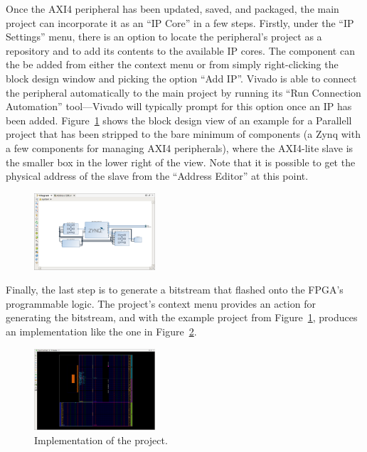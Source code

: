\documentclass[licentiate,g5paper,gu]{chalmers-thesis}
\begin{document}
\begin{appendices}
Once the AXI4 peripheral has been updated, saved, and packaged, the main project can incorporate it as an ``IP Core'' in a few steps. Firstly, under the ``IP Settings'' menu, there is an option to locate the peripheral's project as a repository and to add its contents to the available IP cores. The component can the be added from either the context menu or from simply right-clicking the block design window and picking the option ``Add IP''. Vivado is able to connect the peripheral automatically to the main project by running its ``Run Connection Automation'' tool---Vivado will typically prompt for this option once an IP has been added. Figure~\ref{fig:system} shows the block design view of an example for a Parallell project that has been stripped to the bare minimum of components (a Zynq with a few components for managing AXI4 peripherals), where the AXI4-lite slave is the smaller box in the lower right of the view. Note that it is possible to get the physical address of the slave from the ``Address Editor'' at this point.

\begin{figure}[h]
\includegraphics[width=0.4\textwidth]{figures/ZynqSystem}
\centering
\caption{} %
\label{fig:system}
\end{figure}

Finally, the last step is to generate a bitstream that flashed onto the FPGA's programmable logic. The project's context menu provides an action for generating the bitstream, and with the example project from Figure~\ref{fig:system}, produces an implementation like the one in Figure~\ref{fig:design}.

\begin{figure}[h]
\includegraphics[width=0.4\textwidth]{figures/ZynqDesign}
\centering
\caption{Implementation of the project.}
\label{fig:design}
\end{figure}

\end{appendices}
\end{document}
